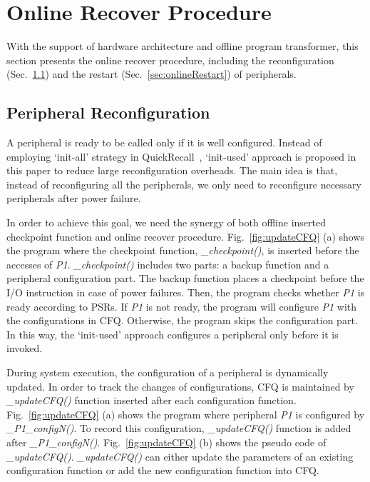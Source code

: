 \section{Online Recover Procedure} \label{sec:online}
%
With the support of hardware architecture and offline program transformer, this section presents the online recover procedure, including the reconfiguration (Sec.~\ref{sec:onlineReconfig}) and the restart (Sec.~\ref{sec:onlineRestart}) of peripherals.

\subsection{Peripheral Reconfiguration} \label{sec:onlineReconfig}
\vspace{-5pt}
%
A peripheral is ready to be called only if it is well configured.
Instead of employing `init-all' strategy in QuickRecall~\cite{jayakumar2014quickrecall}, `init-used' approach is proposed in this paper to reduce large reconfiguration overheads.
The main idea is that, instead of reconfiguring all the peripherals, we only need to reconfigure necessary peripherals after power failure.

%
In order to achieve this goal, we need the synergy of both offline inserted checkpoint function and online recover procedure. 
Fig.~\ref{fig:updateCFQ} (a) shows the program where the checkpoint function, \emph{\_checkpoint()}, is inserted before the accesses of \emph{P1}.
\emph{\_checkpoint()} includes two parts: a backup function and a peripheral configuration part.
The backup function places a checkpoint before the I/O instruction in case of power failures.
Then, the program checks whether \emph{P1} is ready according to PSRs.
If \emph{P1} is not ready, the program will configure \emph{P1} with the configurations in CFQ.
Otherwise, the program skips the configuration part.
In this way, the `init-used' approach configures a peripheral only before it is invoked.

%
During system execution, the configuration of a peripheral is dynamically updated.
In order to track the changes of configurations, CFQ is maintained by \emph{\_updateCFQ()} function inserted after each configuration function.
Fig.~\ref{fig:updateCFQ} (a) shows the program where peripheral \emph{P1} is configured by \emph{\_P1\_configN()}.
To record this configuration, \emph{\_updateCFQ()} function is added after \emph{\_P1\_configN()}.
Fig.~\ref{fig:updateCFQ} (b) shows the pseudo code of \emph{\_updateCFQ()}.
\emph{\_updateCFQ()} can either update the parameters of an existing configuration function or add the new configuration function into CFQ.

